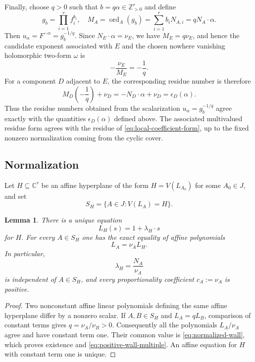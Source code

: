 \documentclass[12pt]{amsart}
\numberwithin{equation}{section}
\theoremstyle{plain}
\newtheorem{lemma}[theorem]{Lemma}
\theoremstyle{definition}
\theoremstyle{remark}
\theoremstyle{definition}
\DeclareMathOperator{\ord}{ord}
\newcommand{\C}{\mathbb C}
\newcommand{\Z}{\mathbb Z}
\begin{document}
Finally, choose $q>0$ such that $b=q\alpha\in\Z_{>0}^r$ and define
\[
g_b=\prod_{i=1}^r f_i^{b_i},\quad M_A=\ord_A(g_b)=\sum_{i=1}^r b_iN_{A,i}=qN_A\cdot\alpha.
\]
Then $u_\alpha=F^{-\alpha}=g_b^{-1/q}$. Since $N_E\cdot\alpha=\nu_E$, we have $M_E=q\nu_E$, and hence the candidate exponent associated with $E$ and the chosen nowhere vanishing holomorphic two-form $\omega$ is
\[
-\frac{\nu_E}{M_E}=-\frac1q.
\]
For a component $D$ adjacent to $E$, the corresponding residue number is therefore
\[
M_D\left(-\frac1q\right)+\nu_D=-N_D\cdot\alpha+\nu_D=\epsilon_D(\alpha).
\]
Thus the residue numbers obtained from the scalarization $u_\alpha=g_b^{-1/q}$ agree exactly with the quantities $\epsilon_D(\alpha)$ defined above. The associated multivalued residue form agrees with the residue of \eqref{eq:local-coefficient-form}, up to the fixed nonzero normalization coming from the cyclic cover.




\subsection{Normalization}

Let $H\subseteq\C^r$ be an affine hyperplane of the form $H=V(L_{A_0})$ for some $A_0\in J$, and set
\begin{equation}\label{eq:same-wall-set}
    S_H=\{A\in J:V(L_A)=H\}.
\end{equation}

\begin{lemma}\label{lem:positive-wall-normalization}
There is a unique equation
\begin{equation}\label{eq:normalized-wall}
 L_H(s)=1+\lambda_H\cdot s
\end{equation}
for $H$. For every $A\in S_H$ one has the exact equality of affine polynomials
\begin{equation}\label{eq:positive-wall-multiple}
 L_A=\nu_A L_H.
\end{equation}
In particular,
\[
 \lambda_H=\frac{N_A}{\nu_A}
\]
is independent of $A\in S_H$, and every proportionality coefficient $c_A:=\nu_A$ is positive.
\end{lemma}

\begin{proof}
Two nonconstant affine linear polynomials defining the same affine hyperplane differ by a nonzero scalar. If $A,B\in S_H$ and $L_A=qL_B$, comparison of constant terms gives $q=\nu_A/\nu_B>0$. Consequently all the polynomials $L_A/\nu_A$ agree and have constant term one. Their common value is \eqref{eq:normalized-wall}, which proves existence and \eqref{eq:positive-wall-multiple}. An affine equation for $H$ with constant term one is unique.
\end{proof}
\end{document}
